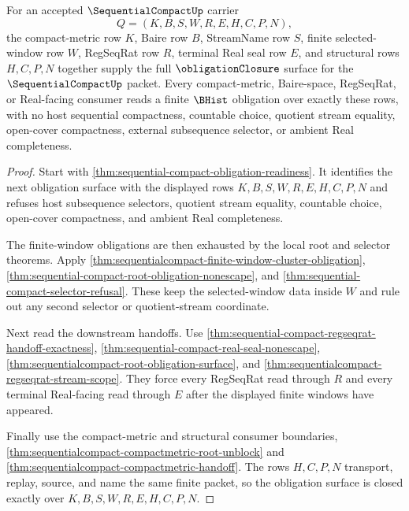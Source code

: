 \begin{theorem}
\label{thm:sequential-compact-obligation-closure}
For an accepted $\SequentialCompactUp$ carrier
$$
Q=(K,B,S,W,R,E,H,C,P,N),
$$
the compact-metric row $K$, Baire row $B$, StreamName row $S$, finite selected-window row $W$, RegSeqRat row $R$, terminal Real seal row $E$, and structural rows $H,C,P,N$ together supply the full $\obligationClosure$ surface for the $\SequentialCompactUp$ packet. Every compact-metric, Baire-space, RegSeqRat, or Real-facing consumer reads a finite $\BHist$ obligation over exactly these rows, with no host sequential compactness, countable choice, quotient stream equality, open-cover compactness, external subsequence selector, or ambient Real completeness.
\end{theorem}
\begin{proof}
Start with \autoref{thm:sequential-compact-obligation-readiness}. It identifies the next obligation surface with the displayed rows $K,B,S,W,R,E,H,C,P,N$ and refuses host subsequence selectors, quotient stream equality, countable choice, open-cover compactness, and ambient Real completeness.

The finite-window obligations are then exhausted by the local root and selector theorems. Apply \autoref{thm:sequentialcompact-finite-window-cluster-obligation}, \autoref{thm:sequential-compact-root-obligation-nonescape}, and \autoref{thm:sequential-compact-selector-refusal}. These keep the selected-window data inside $W$ and rule out any second selector or quotient-stream coordinate.

Next read the downstream handoffs. Use \autoref{thm:sequential-compact-regseqrat-handoff-exactness}, \autoref{thm:sequential-compact-real-seal-nonescape}, \autoref{thm:sequentialcompact-root-obligation-surface}, and \autoref{thm:sequentialcompact-regseqrat-stream-scope}. They force every RegSeqRat read through $R$ and every terminal Real-facing read through $E$ after the displayed finite windows have appeared.

Finally use the compact-metric and structural consumer boundaries, \autoref{thm:sequentialcompact-compactmetric-root-unblock} and \autoref{thm:sequentialcompact-compactmetric-handoff}. The rows $H,C,P,N$ transport, replay, source, and name the same finite packet, so the obligation surface is closed exactly over $K,B,S,W,R,E,H,C,P,N$.
\end{proof}

